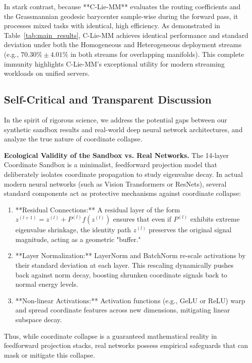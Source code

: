 In stark contrast, because **C-Lie-MM** evaluates the routing coefficients and the Grassmannian geodesic barycenter sample-wise during the forward pass, it processes mixed tasks with identical, high efficiency. As demonstrated in Table~\ref{tab:main_results}, C-Lie-MM achieves identical performance and standard deviation under both the Homogeneous and Heterogeneous deployment streams (e.g., $70.30\% \pm 4.01\%$ in both streams for overlapping manifolds). This complete immunity highlights C-Lie-MM's exceptional utility for modern streaming workloads on unified servers.

\subsection{Self-Critical and Transparent Discussion}

In the spirit of rigorous science, we address the potential gaps between our synthetic sandbox results and real-world deep neural network architectures, and analyze the true nature of coordinate collapse.

\textbf{Ecological Validity of the Sandbox vs. Real Networks.}
The 14-layer Coordinate Sandbox is a minimalist, feedforward projection model that deliberately isolates coordinate propagation to study eigenvalue decay. In actual modern neural networks (such as Vision Transformers or ResNets), several standard components act as protective mechanisms against coordinate collapse:
\begin{enumerate}
    \item **Residual Connections:** A residual layer of the form $z^{(l+1)} = z^{(l)} + P^{(l)} f(z^{(l)})$ ensures that even if $P^{(l)}$ exhibits extreme eigenvalue shrinkage, the identity path $z^{(l)}$ preserves the original signal magnitude, acting as a geometric "buffer."
    \item **Layer Normalization:** LayerNorm and BatchNorm re-scale activations by their standard deviation at each layer. This rescaling dynamically pushes back against norm decay, boosting shrunken coordinate signals back to normal energy levels.
    \item **Non-linear Activations:** Activation functions (e.g., GeLU or ReLU) warp and spread coordinate features across new dimensions, mitigating linear subspace decay.
\end{enumerate}
Thus, while coordinate collapse is a guaranteed mathematical reality in feedforward projection stacks, real networks possess empirical safeguards that can mask or mitigate this collapse. 

